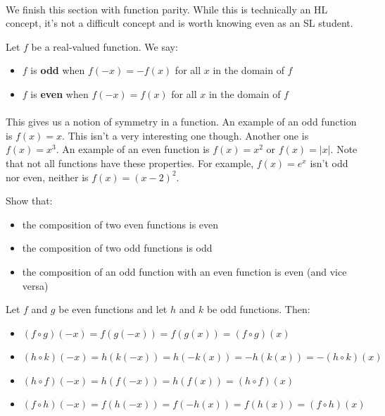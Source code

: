 \documentclass[12pt, a4paper, titlepage, twoside]{article}
\newcounter{excount}[subsection]
\begin{document}
	\paragraph{}
	We finish this section with function parity. While this is technically an HL concept, it's not a difficult concept and is worth knowing even as
	an SL student.\\
	
	\begin{kp}
		Let $f$ be a real-valued function. We say:
		\begin{itemize}
			\item $f$ is \textbf{odd} when $f(-x) = -f(x)$ for all $x$ in the domain of $f$
			\item $f$ is \textbf{even} when $f(-x) = f(x)$ for all $x$ in the domain of $f$
		\end{itemize}		
	\end{kp}
	
	\paragraph{}
	This gives us a notion of symmetry in a function. An example of an odd function is $f(x) = x$. This isn't a very interesting one though.
	Another one is $f(x) = x^3$. An example of an even function is $f(x) = x^2$ or $f(x) = |x|$. Note that not all functions have these properties. 
	For example, $f(x) = e^x$ isn't odd nor even, neither is $f(x) = (x-2)^2$.\\
	
	\begin{ex}
		Show that: 
		\begin{itemize}
			\item the composition of two even functions is even
			\item the composition of two odd functions is odd
			\item the composition of an odd function with an even function is even (and vice versa)
		\end{itemize}
		
		\tcbline
		\hfill
		
		Let $f$ and $g$ be even functions and let $h$ and $k$ be odd functions. Then:
		\begin{itemize}
			\item $(f \circ g)(-x) = f(g(-x)) = f(g(x)) = (f \circ g)(x)$
			\item $(h \circ k)(-x) = h(k(-x)) = h(-k(x)) = -h(k(x)) = -(h \circ k)(x)$
			\item $(h \circ f)(-x) = h(f(-x)) = h(f(x)) = (h \circ f)(x)$
			\item $(f \circ h)(-x) = f(h(-x)) = f(-h(x)) = f(h(x)) = (f \circ h)(x)$
		\end{itemize}
	\end{ex}
	
\end{document}
